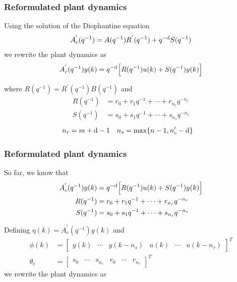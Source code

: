 \begin{frame}
    \frametitle{Reformulated plant dynamics}

    Using the solution of the Diophantine equation
    \begin{equation*}
        A_c^{'}(q^{-1}) = A(q^{-1}) R^{'}(q^{-1}) + q^{-\textrm{d}} S(q^{-1})
    \end{equation*}
    we rewrite the plant dynamics as
    \begin{align*}
        A_c^{'}(q^{-1}) y(k) = q^{-\textrm{d}} \Big[ R(q^{-1}) u(k) + S(q^{-1}) y(k) \Big]
    \end{align*}
    \pause

    where $R(q^{-1}) = R^{'}(q^{-1}) B(q^{-1})$ and
    \begin{align*}
        R(q^{-1}) & = r_0 + r_1 q^{-1} + \cdots + r_{n_r} q^{-n_r} \\
        S(q^{-1}) & = s_0 + s_1 q^{-1} + \cdots + s_{n_s} q^{-n_s}
    \end{align*}
    \begin{align*}
        n_r & = m + \textrm{d} - 1
            & n_s & = \max \{ n-1, n_c' - \textrm{d} \}
    \end{align*}

\end{frame}

\begin{frame}
    \frametitle{Reformulated plant dynamics}

    So far, we know that
    \begin{align*}
        A_c^{'}(q^{-1}) y(k) & = q^{-\textrm{d}} \Big[ R(q^{-1}) u(k) + S(q^{-1}) y(k) \Big] \\
        R(q^{-1}) & = r_0 + r_1 q^{-1} + \cdots + r_{n_r} q^{-n_r} \\
        S(q^{-1}) & = s_0 + s_1 q^{-1} + \cdots + s_{n_s} q^{-n_s}
    \end{align*}

    Defining $\eta(k) = A_c^{'}(q^{-1}) y(k)$ and
    \begin{align*}
        \phi(k) & = \begin{bmatrix}
                y(k) & \cdots & y(k-n_s) & u(k) & \cdots & u(k-n_r)
            \end{bmatrix}^T \\
        \theta_c & = \begin{bmatrix}
                s_0 & \cdots & s_{n_s} & r_0 & \cdots & r_{n_r}
            \end{bmatrix}^T
    \end{align*}
    we rewrite the plant dynamics as

\end{frame}

